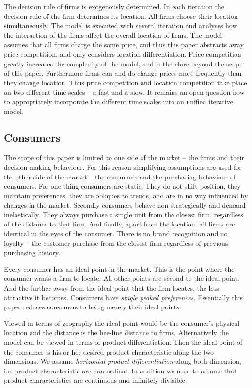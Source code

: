 \documentclass[preprint, 12pt]{elsarticle}
\begin{document}
The decision rule of firms is exogenously determined. In each iteration the decision rule of the firm determines its location. All firms choose their location simultaneously. The model is executed with several iteration and analyses how the interaction of the firms affect the overall location of firms. The model assumes that all firms charge the same price, and thus this paper abstracts away price competition, and only considers location differentiation. Price competition greatly increases the complexity of the model, and is therefore beyond the scope of this paper. Furthermore firms can and do change prices more frequently than they change location. Thus price competition and location competition take place on two different time scales -- a fast and a slow. It remains an open question how to appropriately incorporate the different time scales into an unified iterative model.

\subsection{Consumers}

The scope of this paper is limited to one side of the market -- the firms and their decision-making behaviour. For this reason simplifying assumptions are used for the other side of the market -- the consumers and the purchasing behaviour of consumers. For one thing consumers are static. They do not shift position, they maintain preferences, they are obliques to trends, and are in no way influenced by changes in the market. Secondly consumers behave non-strategically and demand inelastically. They always purchase a single unit from the closest firm, regardless of the distance to that firm. And finally, apart from the location, all firms are identical in the eyes of the consumer. There is no brand recognition and no loyalty -- the customer purchase from the closest firm regardless of previous purchasing history.

Every consumer has an ideal point in the market. This is the point where the consumer wants a firm to locate. All other points are second to the ideal point. And the further away from the ideal point that the firm locates, the less attractive it becomes. Consumers have \emph{single peaked preferences}. Essentially this paper reduces consumers to being merely their ideal points. 

Viewed in terms of geography the ideal point would be the consumer's physical location and the distance is the bee-line distance to firms. Alternatively the model can be viewed in terms of product differentiation. Then the ideal point of the consumer is his or her desired product characteristic along the two dimensions. We assume \emph{horizontal product differentiation} along both dimension, i.e. product characteristic are non-ordinal. In addition we need to assume that product characteristics are continuous and infinitely divisible.
\end{document}
